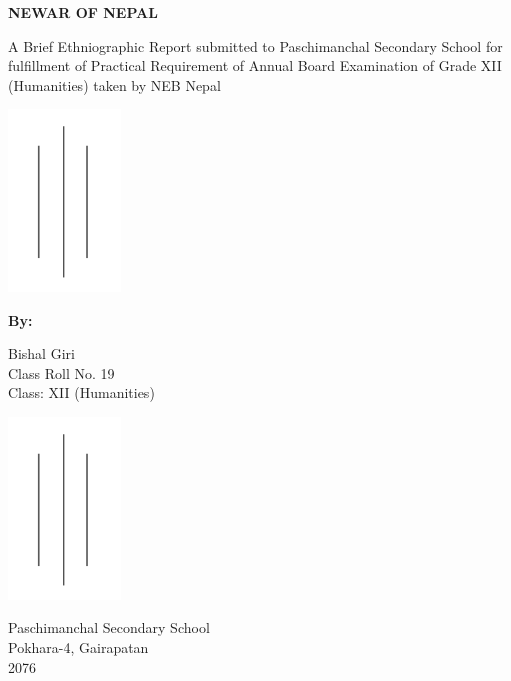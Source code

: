 \documentclass[a4paper,13pt, margin=0.9in]{article}
\begin{document}
\begin{titlepage}
	\centering
	{\bfseries\Large
		NEWAR OF NEPAL\\
		\vskip1cm


	}
	A Brief Ethniographic Report submitted to Paschimanchal Secondary School for fulfillment of Practical Requirement of Annual Board Examination of Grade XII (Humanities) taken by NEB Nepal
	\vskip1cm


	\includegraphics[width=3cm]{sample.png}
	\vskip1cm

	\textbf{By:}

	Bishal Giri\\
	Class Roll No. 19 \\
	Class: XII (Humanities)

	\vskip0.5cm

	\includegraphics[width=3cm]{sample.png}

	\vskip0.5cm

	Paschimanchal Secondary School \\
	Pokhara-4, Gairapatan \\
	2076
\end{titlepage}
\end{document}
